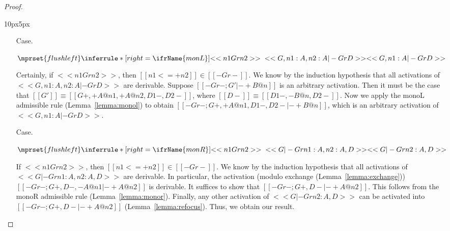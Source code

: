 \begin{proof}
\begin{changemargin}{10px}{5px}
\begin{itemize}
  \item[Case.]\ \\ 
    \begin{center}
      \begin{math}
        $$\mprset{flushleft}
        \inferrule* [right=\ifrName{monL}] {
          <<n1 Gr n2>>
          \\\\
          <<G , n1 : A , n2 : A |- Gr D>>
        }{<<G , n1 : A |- Gr D>>}
      \end{math}
    \end{center}
    Certainly, if $<<n1 Gr n2>>$, then $[[n1 <=+ n2]] \in [[-Gr-]]$.
    We know by the induction hypothesis that all activations of $<<G , n1 : A , n2 : A |- Gr D>>$ are
    derivable.  Suppose $[[-Gr- ; G' |- + B @ n]]$ is an arbitrary activation.  Then it must be the case
    that $[[G']] \equiv [[{G}+, +A@n1,+A@n2,{D1}-,{D2}-]]$, where $[[{D}-]] \equiv [[{D1}-,-B@n,{D2}-]]$.
    Now we apply the monoL admissible rule (Lemma~\ref{lemma:monol}) to obtain 
    $[[-Gr- ; {G}+, +A@n1,{D1}-,{D2}- |- + B @ n]]$, which is an arbitrary activation of 
    $<<G , n1 : A |- Gr D>>$.

  \item[Case.]\ \\ 
    \begin{center}
      \begin{math}
        $$\mprset{flushleft}
        \inferrule* [right=\ifrName{monR}] {
          <<n1 Gr n2>>
          \\\\
          <<G |- Gr n1 : A , n2 : A, D>>
        }{<<G |- Gr n2 : A, D>>}
      \end{math}
    \end{center}    
    If $<<n1 Gr n2>>$, then $[[n1 <=+ n2]] \in [[-Gr-]]$.  We know by the induction hypothesis that
    all activations of $<<G |- Gr n1 : A , n2 : A, D>>$ are derivable.  In particular, the activation
    (modulo exchange (Lemma~\ref{lemma:exchange})) $[[-Gr-; {G}+, {D}-, -A@n1 |- + A @ n2]]$ is
    derivable.  It suffices to show that $[[-Gr-; {G}+, {D}- |- + A @ n2]]$. This follows from
    the monoR admissible rule (Lemma~\ref{lemma:monor}).  Finally, any other activation of $<<G |- Gr n2 : A, D>>$
    can be activated into $[[-Gr-; {G}+, {D}- |- + A @ n2]]$ (Lemma~\ref{lemma:refocus}).  Thus,
    we obtain our result.
    

\end{itemize}
\end{changemargin}
\end{proof}
